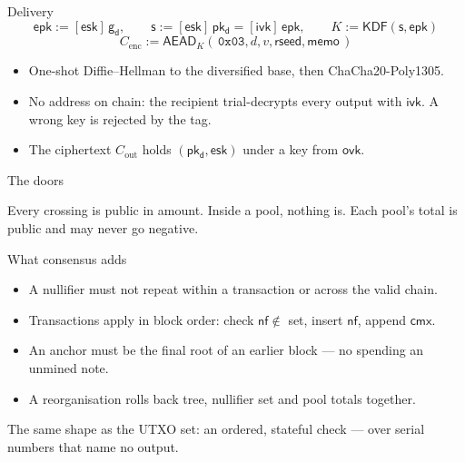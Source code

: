 \documentclass[aspectratio=169,11pt]{beamer}
\newcommand{\F}{\mathbb{F}}
\newcommand{\Ep}{\ensuremath{\mathcal{E}}}
\newcommand{\nfsym}{\ensuremath{\mathsf{nf}}}
\newcommand{\cmx}{\ensuremath{\mathsf{cmx}}}
\newcommand{\gd}{\ensuremath{\mathsf{g_d}}}
\newcommand{\pkd}{\ensuremath{\mathsf{pk_d}}}
\newcommand{\ivk}{\ensuremath{\mathsf{ivk}}}
\newcommand{\ovk}{\ensuremath{\mathsf{ovk}}}
\newcommand{\esk}{\ensuremath{\mathsf{esk}}}
\newcommand{\epk}{\ensuremath{\mathsf{epk}}}
\newcommand{\vbal}{\ensuremath{v_{\mathrm{balance}}}}
\newcommand{\Ecenc}{\ensuremath{C_{\mathrm{enc}}}}
\newcommand{\Ecout}{\ensuremath{C_{\mathrm{out}}}}
\newcommand{\types}[1]{\par\smallskip{\small\color{arbdim}#1}\par}
\begin{document}
\begin{frame}{Delivery}
\[
\epk := [\esk]\,\gd,\qquad
\mathsf{s} := [\esk]\,\pkd = [\ivk]\,\epk,\qquad
K := \mathsf{KDF}(\mathsf{s}, \epk)
\]
\[
\Ecenc := \mathsf{AEAD}_K(\,\mathtt{0x03}, d, v, \mathsf{rseed}, \mathsf{memo}\,)
\]
\types{$\esk \in \F_q$; $\gd, \pkd, \epk, \mathsf{s} \in \Ep$; $K \in \{0,1\}^{256}$; $\Ecenc$: $580$ bytes.}
\vfill
\begin{itemize}\itemsep6pt
  \item One-shot Diffie--Hellman to the diversified base, then
    ChaCha20-Poly1305.
  \item No address on chain: the recipient trial-decrypts every output
    with $\ivk$. A wrong key is rejected by the tag.
  \item The ciphertext $\Ecout$ holds $(\pkd, \esk)$ under a key from $\ovk$.
\end{itemize}
\end{frame}

\begin{frame}{The doors}
\begin{center}
\end{center}
\vfill
Every crossing is public in amount. Inside a pool, nothing is.
Each pool's total is public and may never go negative.
\end{frame}

\begin{frame}{What consensus adds}
\begin{itemize}\itemsep8pt
  \item A nullifier must not repeat within a transaction or across the
    valid chain.
  \item Transactions apply in block order: check $\nfsym \notin$ set,
    insert $\nfsym$, append $\cmx$.
  \item An anchor must be the final root of an earlier block --- no
    spending an unmined note.
  \item A reorganisation rolls back tree, nullifier set and pool totals
    together.
\end{itemize}
\vfill
The same shape as the UTXO set: an ordered, stateful check --- over serial
numbers that name no output.
\end{frame}
\end{document}
